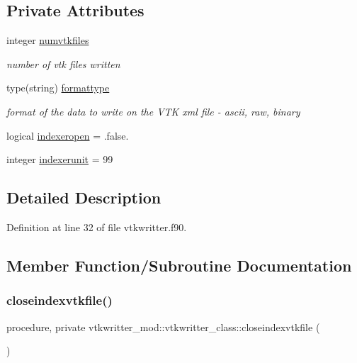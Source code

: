 \subsection*{Private Attributes}
\begin{DoxyCompactItemize}
\item 
integer \mbox{\hyperlink{structvtkwritter__mod_1_1vtkwritter__class_a31a432e4d44ff478500f0f95bb8582d2}{numvtkfiles}}
\begin{DoxyCompactList}\small\item\em number of vtk files written \end{DoxyCompactList}\item 
type(string) \mbox{\hyperlink{structvtkwritter__mod_1_1vtkwritter__class_a1488d11c6ab4adaf97a2eac301bab694}{formattype}}
\begin{DoxyCompactList}\small\item\em format of the data to write on the V\+TK xml file -\/ ascii, raw, binary \end{DoxyCompactList}\item 
logical \mbox{\hyperlink{structvtkwritter__mod_1_1vtkwritter__class_a008c58d836b282731d2ad9caabb7629c}{indexeropen}} = .false.
\item 
integer \mbox{\hyperlink{structvtkwritter__mod_1_1vtkwritter__class_a75ca6f11bb375eac69b0bd5eb8dbdbf4}{indexerunit}} = 99
\end{DoxyCompactItemize}


\subsection{Detailed Description}


Definition at line 32 of file vtkwritter.\+f90.



\subsection{Member Function/\+Subroutine Documentation}
\mbox{\label{structvtkwritter__mod_1_1vtkwritter__class_af87d85e730f5865b23012cea94d5274e}} 
\subsubsection{\texorpdfstring{closeindexvtkfile()}{closeindexvtkfile()}}
{\footnotesize\ttfamily procedure, private vtkwritter\+\_\+mod\+::vtkwritter\+\_\+class\+::closeindexvtkfile (\begin{DoxyParamCaption}{ }\end{DoxyParamCaption})\hspace{0.3cm}{\ttfamily [private]}}



